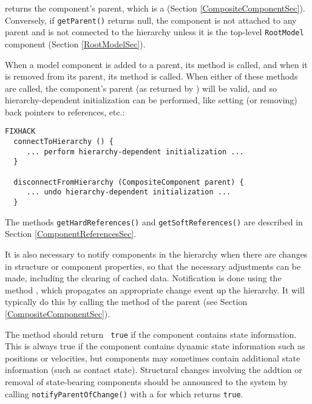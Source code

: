 \documentclass{article}
\begin{document}
 returns the component's
parent, which is a  (Section
\ref{CompositeComponentSec}). Conversely, if {\tt getParent()} returns
null, the component is not attached to any parent and is not connected
to the hierarchy unless it is the top-level {\tt RootModel} component
(Section \ref{RootModelSec}).

When a model component is added to a parent, its method
 is called, and when
it is removed from its parent, its method
 is called.
When either of these methods are called, the component's parent
(as returned by )
will be valid, and so hierarchy-dependent initialization
can be performed, like setting (or removing) back pointers to references, etc.:
\begin{lstlisting}FIXHACK
  connectToHierarchy () {
     ... perform hierarchy-dependent initialization ...
  }

  disconnectFromHierarchy (CompositeComponent parent) {
     ... undo hierarchy-dependent initialization ...
  }
\end{lstlisting}

The methods {\tt getHardReferences()} and {\tt getSoftReferences()}
are described in Section \ref{ComponentReferencesSec}.
 
It is also necessary to notify components in the hierarchy when there
are changes in structure or component properties, so that the
necessary adjustments can be made, including the clearing of cached
data. Notification is done using the method
, which propagates
an appropriate change event up the hierarchy. It will typically do
this by calling the
 method of the
parent (see Section \ref{CompositeComponentSec}).

The method  should return {\tt
true} if the component contains state information. This is always true
if the component contains dynamic state information such as positions
or velocities, but components may sometimes contain additional state
information (such as contact state). Structural changes
involving the addtion or removal of state-bearing components should be
announced to the system by calling {\tt notifyParentOfChange()} with a
 for which
 returns {\tt true}.
\end{document}
